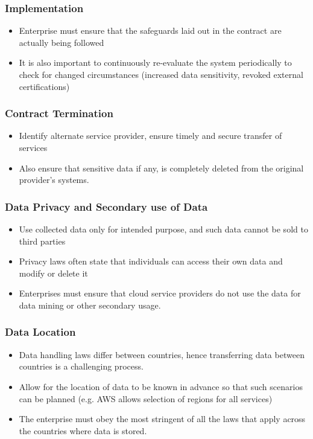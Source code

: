\documentclass{article}
\begin{document}
\subsubsection{Implementation}
\begin{itemize}
    \item Enterprise must ensure that the safeguards laid out in the contract are actually being followed
    
    \item It is also important to continuously re-evaluate the system periodically to check for changed circumstances (increased data sensitivity, revoked external certifications)
\end{itemize}

\subsubsection{Contract Termination}
\begin{itemize}
    \item Identify alternate service provider, ensure timely and secure transfer of services
    
    \item Also ensure that sensitive data if any, is completely deleted from the original provider's systems.
\end{itemize}

\subsubsection{Data Privacy and Secondary use of Data}
\begin{itemize}
    \item Use collected data only for intended purpose, and such data cannot be sold to third parties 
    
    \item Privacy laws often state that individuals can access their own data and modify or delete it
    
    \item Enterprises must ensure that cloud service providers do not use the data for
data mining or other secondary usage.

\end{itemize}

\subsubsection{Data Location}
\begin{itemize}
    \item Data handling laws differ between countries, hence transferring data between countries is a challenging process. 
    
    \item Allow for the location of data to be known in advance so that such scenarios can be planned (e.g. AWS allows selection of regions for all services)
    
    \item The enterprise must obey the most stringent of all the laws that apply across the countries where data is stored. 
\end{itemize}
\end{document}
